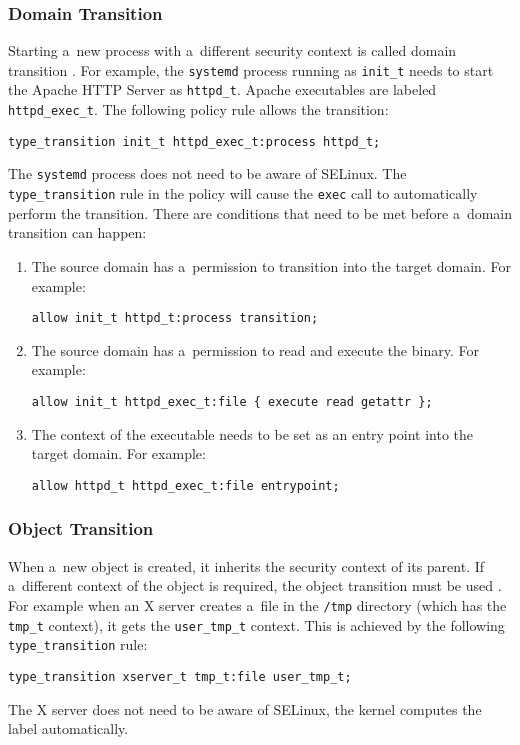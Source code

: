 \subsubsection{Domain Transition}
Starting a~new process with a~different security context is called domain
transition \cite[pp.~43--47]{tsn}. For example, the \texttt{systemd} process
running as \texttt{init\_t} needs to start the Apache HTTP Server as
\texttt{httpd\_t}. Apache executables are labeled \texttt{httpd\_exec\_t}. The
following policy rule allows the transition:
\begin{lstlisting}[language=te]
type_transition init_t httpd_exec_t:process httpd_t;
\end{lstlisting}
The \texttt{systemd} process does not need to be aware of SELinux. The
\texttt{type\_transition} rule in the policy will cause the \texttt{exec} call
to automatically perform the transition. There are conditions that need to be
met before a~domain transition can happen:
\begin{enumerate}
    \item The source domain has a~permission to transition into the target
        domain. For example:
\begin{lstlisting}[language=te]
allow init_t httpd_t:process transition;
\end{lstlisting}
    \item The source domain has a~permission to read and execute the binary. For
        example:
\begin{lstlisting}[language=te]
allow init_t httpd_exec_t:file { execute read getattr };
\end{lstlisting}
    \item The context of the executable needs to be set as an entry point into
        the target domain. For example:
\begin{lstlisting}[language=te]
allow httpd_t httpd_exec_t:file entrypoint;
\end{lstlisting}
\end{enumerate}

\subsubsection{Object Transition}
When a~new object is created, it inherits the security context of its parent. If
a~different context of the object is required, the object transition must be
used \cite[pp.~47--48]{tsn}. For example when an X server creates a~file in the
\texttt{/tmp} directory (which has the \texttt{tmp\_t} context), it gets the 
\texttt{user\_tmp\_t} context. This is achieved by the following
\texttt{type\_transition} rule:
\begin{lstlisting}[language=te]
type_transition xserver_t tmp_t:file user_tmp_t;
\end{lstlisting}
The X server does not need to be aware of SELinux, the kernel computes the label
automatically.

